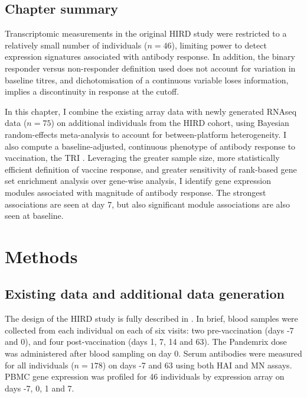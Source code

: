 \subsection{Chapter summary}

Transcriptomic measurements in the original \gls{HIRD} study were restricted to a relatively small number of individuals ($n=46$), limiting power to detect expression signatures associated with antibody response.
In addition, the binary responder versus non-responder definition used does not account for variation in baseline titres, 
and dichotomisation of a continuous variable loses information,
implies a discontinuity in response at the cutoff.

In this chapter, I combine the existing array data with newly generated \gls{RNAseq} data ($n=75$) on additional individuals from the \gls{HIRD} cohort, 
using Bayesian random-effects meta-analysis to account for between-platform heterogeneity.
I also compute a baseline-adjusted, continuous phenotype of antibody response to vaccination, the \gls{TRI} \autocite{bucasas2011EarlyPatternsGene}.
Leveraging the greater sample size,
more statistically efficient definition of vaccine response,
and greater sensitivity of rank-based gene set enrichment analysis over gene-wise analysis,
I identify gene expression modules associated with magnitude of antibody response.
The strongest associations are seen at day 7, but also significant module associations are also seen at baseline.

\section{Methods}

\subsection{Existing  data and additional data generation}
\label{subsec:hird_dge_studyDesign}

The design of the \gls{HIRD} study is fully described in \textcite{sobolev2016AdjuvantedInfluenzaH1N1Vaccination}.
In brief, blood samples were collected from each individual on each of six visits:
two pre-vaccination (days -7 and 0), and four post-vaccination (days 1, 7, 14 and 63).
The Pandemrix dose was administered after blood sampling on day 0.
Serum antibodies were measured for all individuals ($n=178$) on days -7 and 63 using both \gls{HAI} and \gls{MN} assays. 
\gls{PBMC} gene expression was profiled for 46 individuals by expression array on days -7, 0, 1 and 7.

